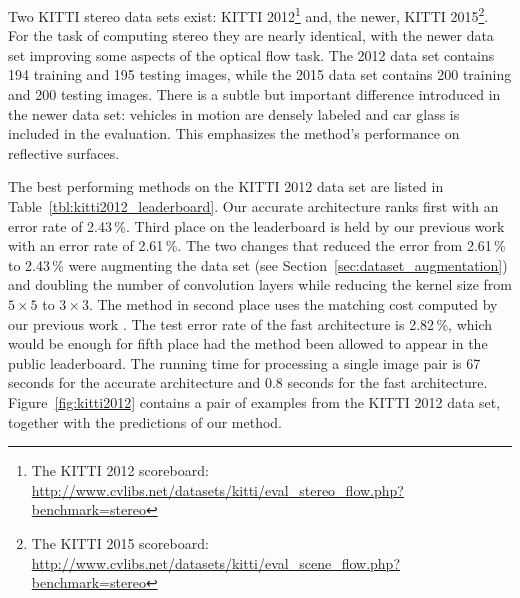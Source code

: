 \documentclass[twoside,11pt]{article}
\begin{document}
Two KITTI stereo data sets exist: KITTI 2012\footnote{The KITTI 2012
scoreboard:
\url{http://www.cvlibs.net/datasets/kitti/eval_stereo_flow.php?benchmark=stereo}}
and, the newer, KITTI 2015\footnote{The KITTI 2015 scoreboard:
\url{http://www.cvlibs.net/datasets/kitti/eval_scene_flow.php?benchmark=stereo}}.
For the task of computing stereo they are nearly identical, with the newer data
set improving some aspects of the optical flow task. The 2012 data set contains
194 training and 195 testing images, while the 2015 data set contains 200
training and 200 testing images. There is a subtle but important difference
introduced in the newer data set: vehicles in motion are densely labeled and
car glass is included in the evaluation. This emphasizes the method's
performance on reflective surfaces.

The best performing methods on the KITTI 2012 data set are listed in
Table~\ref{tbl:kitti2012_leaderboard}. Our accurate architecture ranks first
with an error rate of 2.43\,\%. Third place on the leaderboard is held by our
previous work \citep{Zbontar_2015_CVPR} with an error rate of 2.61\,\%. The two
changes that reduced the error from 2.61\,\% to 2.43\,\% were augmenting the
data set (see Section~\ref{sec:dataset_augmentation}) and doubling the number
of convolution layers while reducing the kernel size from $5 \times 5$ to $3
\times 3$. The method in second place \citep{guney2015displets} uses the
matching cost computed by our previous work \citep{Zbontar_2015_CVPR}. The
test error rate of the fast architecture is 2.82\,\%, which would be enough for
fifth place had the method been allowed to appear in the public leaderboard.
The running time for processing a single image pair is 67 seconds for the
accurate architecture and 0.8 seconds for the fast architecture.
Figure~\ref{fig:kitti2012} contains a pair of examples from the KITTI 2012 data
set, together with the predictions of our method.
\end{document}
